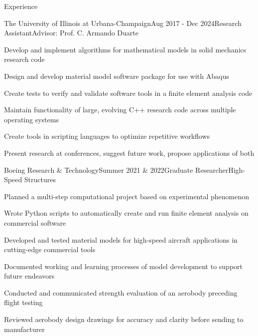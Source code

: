 \documentclass{resume} %
\begin{document}
\begin{rSection}{Experience}

\begin{rSubsection}{The University of Illinois at Urbana-Champaign}{Aug 2017 - Dec 2024}{Research Assistant}{Advisor: Prof. C. Armando Duarte}
\item Develop and implement algorithms for mathematical models in solid mechanics research code
\item Design and develop material model software package for use with Abaqus
\item Create tests to verify and validate software tools in a finite element analysis code
\item Maintain functionality of large, evolving C++ research code across multiple operating systems
\item Create tools in scripting languages to optimize repetitive workflows
\item Present research at conferences, suggest future work, propose applications of both
\end{rSubsection}


\begin{rSubsection}{Boeing Research \& Technology}{Summer 2021  \& 2022}{Graduate Researcher}{High-Speed Structures}
%
\item Planned a multi-step computational project based on experimental phenomenon
\item Wrote Python scripts to automatically create and run finite element analysis on commercial software
\item Developed and tested material models for high-speed aircraft applications in cutting-edge commercial tools
\item Documented working and learning processes of model development to support future endeavors
\item Conducted and communicated strength evaluation of an aerobody preceding flight testing
\item Reviewed aerobody design drawings for accuracy and clarity before sending to manufacturer
\end{rSubsection}

\end{rSection}

\end{document}
